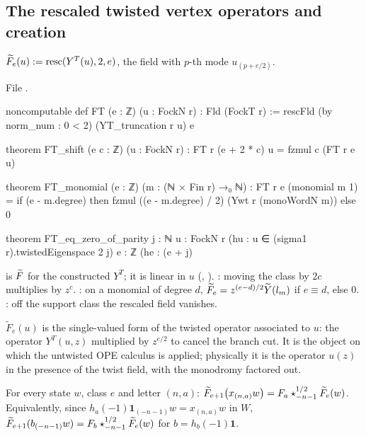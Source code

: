 \subsection{The rescaled twisted vertex operators and creation}

\begin{definition}\label{ch07:def:FT}
$\widetilde{F}_e(u) := \mathrm{resc}(Y^T(u),2,e)$, the field with $p$-th mode $u_{(p+e/2)}$.
\end{definition}

\noindent File .
\begin{leancode}
noncomputable def FT (e : ℤ) (u : FockN r) : Fld (FockT r) :=
  rescFld (by norm_num : 0 < 2) (YT_truncation r u) e

theorem FT_shift (e c : ℤ) (u : FockN r) : FT r (e + 2 * c) u = fzmul c (FT r e u)

theorem FT_monomial (e : ℤ) (m : (ℕ × Fin r) →₀ ℕ) :
    FT r e (monomial m 1) = if (e - m.degree) %
      then fzmul ((e - m.degree) / 2) (Ywt r (monoWordN m)) else 0

theorem FT_eq_zero_of_parity {j : ℕ} {u : FockN r} (hu : u ∈ (sigma1 r).twistedEigenspace 2 j)
    {e : ℤ} (he : (e + j) %
\end{leancode}

\begin{dictionary}
 is $\widetilde{F}$ for the constructed $Y^T$; it is linear in $u$ (,
). : moving the class by $2c$ multiplies by $z^c$.
: on a monomial of degree $d$, $\widetilde{F}_e = z^{(e-d)/2}\widetilde Y(l_m)$ if
$e\equiv d$, else $0$. : off the support class the rescaled field
vanishes.
\end{dictionary}

\begin{physics}
$\widetilde F_e(u)$ is the single-valued form of the twisted operator associated to $u$: the operator $Y^T(u,z)$ multiplied by $z^{e/2}$ to cancel the branch cut. It is the object on which the untwisted OPE calculus is applied; physically it is the operator $u(z)$ in the presence of the twist field, with the monodromy factored out.
\end{physics}

\begin{theorem}[Creation]\label{ch07:thm:creation}
For every state $w$, class $e$ and letter $(n,a)$:
$\widetilde{F}_{e+1}\bigl(x_{(n,a)}w\bigr) = F_a\star^{1/2}_{-n-1}\widetilde{F}_e(w)$. Equivalently, since
$h_a(-1)\mathbf 1_{(-n-1)}w = x_{(n,a)}w$ in $W$,
$\widetilde{F}_{e+1}(b_{(-n-1)}w) = F_b\star^{1/2}_{-n-1}\widetilde{F}_e(w)$ for $b = h_b(-1)\mathbf 1$.
\end{theorem}

